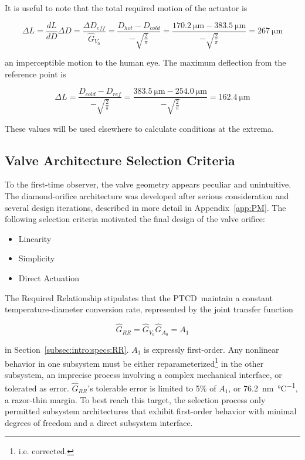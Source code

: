 \documentclass[12pt, letterpaper]{report}%
\newcounter{mycounter}           %
\newcounter{sub}[mycounter]      %
\newcommand{\device}{PTCD}
\newcommand{\specActDefTotal}{\SI{267}{\micro \meter}}
\newcommand{\specActDefHot}{\SI{162.4}{\micro \meter}}
\begin{document}
				It is useful to note that the total required motion of the actuator is

				\begin{equation}
					\Delta L = \frac{dL}{dD} \Delta D = \frac{\Delta D_{eff}}{\hat{G}_{V_0}} = \frac{D_{hot} - D_{cold}}{-\sqrt{\frac{2}{\pi}}} = \frac{\SI{170.2}{\micro\meter} - \SI{383.5}{\micro\meter}}{-\sqrt{\frac{2}{\pi}}} = \specActDefTotal
				\end{equation}

				an imperceptible motion to the human eye. The maximum deflection from the reference point is

				\begin{equation}
					\Delta L = \frac{D_{cold} - D_{ref}}{-\sqrt{\frac{2}{\pi}}} = \frac{\SI{383.5}{\micro\meter} - \SI{254.0}{\micro\meter}}{-\sqrt{\frac{2}{\pi}}} = \specActDefHot
					\label{eq:act_def_hot}
				\end{equation}

				These values will be used elsewhere to calculate conditions at the extrema.

		\subsection{Valve Architecture Selection Criteria}
		\label{subsec:design:just:geo_sel}

			To the first-time observer, the valve geometry appears peculiar and unintuitive.
			The diamond-orifice architecture was developed after serious consideration and several design iterations, described in more detail in Appendix~\ref{app:PM}.
			The following selection criteria motivated the final design of the valve orifice:

			\begin{itemize}
				\item Linearity
				\item Simplicity
				\item Direct Actuation
			\end{itemize}

			The Required Relationship stipulates that the \device\ maintain a constant temperature-diameter conversion rate, represented by the joint transfer function

			\begin{equation*}
				\hat{G}_{RR} = \hat{G}_{V_0} \hat{G}_{A_0} = A_1
			\end{equation*}

			in Section~\ref{subsec:intro:specs:RR}. $A_1$ is expressly first-order. Any nonlinear behavior in one subsystem must be either reparameterized\footnote{i.e. corrected.} in the other subsystem, an imprecise process involving a complex mechanical interface, or tolerated as error.
			$\hat{G}_{RR}$'s tolerable error is limited to 5\% of $A_1$, or \SI{76.2}{\nano\meter\per\celsius}, a razor-thin margin.
			To best reach this target, the selection process only permitted subsystem architectures that exhibit first-order behavior with minimal degrees of freedom and a direct subsystem interface.
			
\end{document}
